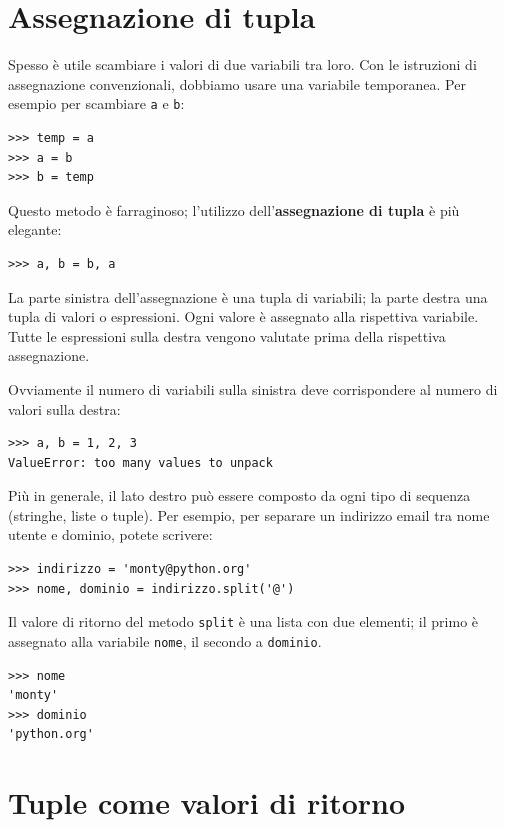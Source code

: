 \documentclass[10pt]{book}
\begin{document}
\section{Assegnazione di tupla}
\label{tuple.assignment}

Spesso è utile scambiare i valori di due variabili tra loro. Con le istruzioni di assegnazione convenzionali, dobbiamo usare una variabile temporanea. Per esempio per scambiare {\tt a} e {\tt b}:

\begin{verbatim}
>>> temp = a
>>> a = b
>>> b = temp
\end{verbatim}
%
Questo metodo è farraginoso; l'utilizzo dell'{\bf assegnazione di tupla} è più elegante:

\begin{verbatim}
>>> a, b = b, a
\end{verbatim}
%
La parte sinistra dell'assegnazione è una tupla di variabili; la parte
   destra una tupla di valori o espressioni. Ogni valore è assegnato alla rispettiva variabile. Tutte le espressioni sulla destra vengono valutate prima della rispettiva assegnazione.

Ovviamente il numero di variabili sulla sinistra deve corrispondere al
   numero di valori sulla destra:

\begin{verbatim}
>>> a, b = 1, 2, 3
ValueError: too many values to unpack
\end{verbatim}
%
Più in generale, il lato destro può essere composto da ogni tipo di sequenza (stringhe, liste o tuple). Per esempio, per separare un indirizzo email tra nome utente e dominio, potete scrivere:

\begin{verbatim}
>>> indirizzo = 'monty@python.org'
>>> nome, dominio = indirizzo.split('@')
\end{verbatim}
%
Il valore di ritorno del metodo {\tt split} è una lista con due elementi; il primo è assegnato alla variabile {\tt nome}, il secondo a {\tt dominio}.

\begin{verbatim}
>>> nome
'monty'
>>> dominio
'python.org'
\end{verbatim}
%

\section{Tuple come valori di ritorno}
\end{document}
